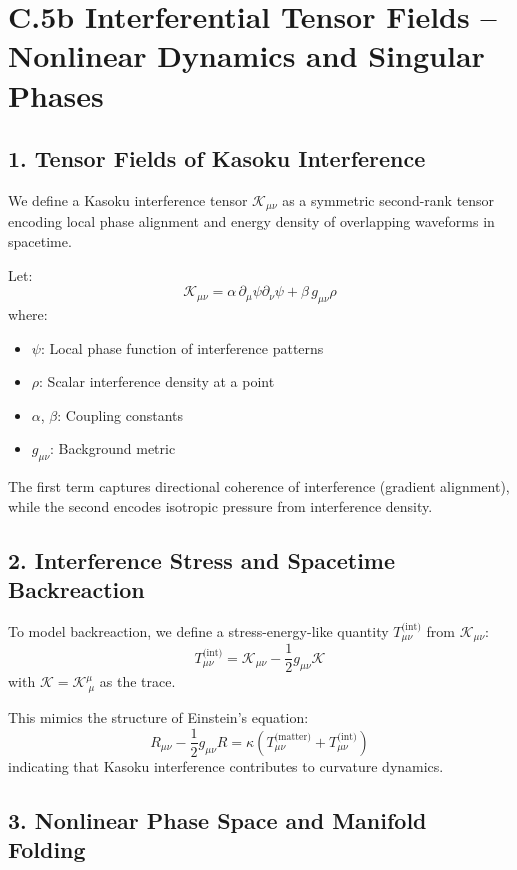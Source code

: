 \section{C.5b Interferential Tensor Fields – Nonlinear Dynamics and Singular Phases}

\subsection*{1. Tensor Fields of Kasoku Interference}

We define a Kasoku interference tensor $\mathcal{K}_{\mu\nu}$ as a symmetric second-rank tensor encoding local phase alignment and energy density of overlapping waveforms in spacetime.

Let:
\[
\mathcal{K}_{\mu\nu} = \alpha\, \partial_\mu \psi \partial_\nu \psi + \beta\, g_{\mu\nu} \rho
\]
where:
\begin{itemize}
  \item $\psi$: Local phase function of interference patterns
  \item $\rho$: Scalar interference density at a point
  \item $\alpha$, $\beta$: Coupling constants
  \item $g_{\mu\nu}$: Background metric
\end{itemize}

The first term captures directional coherence of interference (gradient alignment), while the second encodes isotropic pressure from interference density.

\subsection*{2. Interference Stress and Spacetime Backreaction}

To model backreaction, we define a stress-energy-like quantity $T^{\text{(int)}}_{\mu\nu}$ from $\mathcal{K}_{\mu\nu}$:
\[
T^{\text{(int)}}_{\mu\nu} = \mathcal{K}_{\mu\nu} - \frac{1}{2} g_{\mu\nu} \mathcal{K}
\]
with $\mathcal{K} = \mathcal{K}^{\mu}_{\ \mu}$ as the trace.

This mimics the structure of Einstein's equation:
\[
R_{\mu\nu} - \frac{1}{2} g_{\mu\nu} R = \kappa (T^{\text{(matter)}}_{\mu\nu} + T^{\text{(int)}}_{\mu\nu})
\]
indicating that Kasoku interference contributes to curvature dynamics.

\subsection*{3. Nonlinear Phase Space and Manifold Folding}

